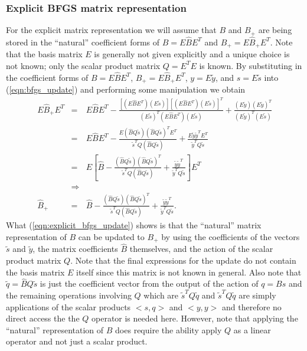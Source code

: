 \documentclass[pdf,ps2pdf,11pt]{SANDreport}
\begin{document}
\subsubsection{Explicit BFGS matrix representation}

For the explicit matrix representation we will assume that $B$ and $B_+$ are
being stored in the ``natural'' coefficient forms of $B = E {}\hat{B} E^T$
and $B_+ = E {}\hat{B}_+ E^T$.  Note that the basis matrix $E$ is generally
not given explicitly and a unique choice is not known; only the scalar product
matrix $Q = E^T E$ is known.  By substituting in the coefficient forms of $B =
E {}\hat{B} E^T$, $B_+ = E {}\hat{B}_+ E^T$, $y = E {}\tilde{y}$, and $s =
E {}\tilde{s}$ into (\ref{eqn:bfgs_update}) and performing some manipulation
we obtain
%
\begin{eqnarray}
E \hat{B}_+ E^T
& = & E \hat{B} E^T
  - \frac{[(E \hat{B} E^T)(E \tilde{s})][(E \hat{B} E^T)(E \tilde{s})]^T}{(E \tilde{s})^T(E \hat{B} E^T)(E \tilde{s})}
  + \frac{(E \tilde{y})(E \tilde{y})^T}{(E \tilde{y})^T (E \tilde{s})} \nonumber \\
& = & E \hat{B} E^T
  - \frac{E(\hat{B} Q \tilde{s})(\hat{B} Q \tilde{s})^T E^T}{\tilde{s}^T Q (\hat{B} Q \tilde{s})}
  + \frac{E \tilde{y} \tilde{y}^T E^T}{\tilde{y}^T Q \tilde{s}} \nonumber \\
& = & E \left[
  \hat{B}
  - \frac{(\hat{B} Q \tilde{s})(\hat{B} Q \tilde{s})^T}{\tilde{s}^T Q (\hat{B} Q \tilde{s})}
  + \frac{\tilde{y} \tilde{y}^T}{\tilde{y}^T Q \tilde{s}}
  \right] E^T \nonumber \\
& \Rightarrow & \nonumber \\
\hat{B}_+
& = & \hat{B}
  - \frac{(\hat{B} Q \tilde{s})(\hat{B} Q \tilde{s})^T}{\tilde{s}^T Q (\hat{B} Q \tilde{s})}
  + \frac{\tilde{y} \tilde{y}^T}{\tilde{y}^T Q \tilde{s}}.
\label{eqn:explicit_bfgs_update}
\end{eqnarray}
%
What (\ref{eqn:explicit_bfgs_update}) shows is that the ``natural'' matrix
representation of $B$ can be updated to $B_+$ by using the coefficients of the
vectors $\tilde{s}$ and $\tilde{y}$, the matrix coefficients $\hat{B}$
themselves, and the action of the scalar product matrix $Q$.  Note that the
final expressions for the update do not contain the basis matrix $E$ itself
since this matrix is not known in general.  Also note that $\tilde{q} =
{}\hat{B}Q\tilde{s}$ is just the coefficient vector from the output of the
action of $q = B s$ and the remaining operations involving $Q$ which are
$\tilde{s}^T Q\tilde{q}$ and $\tilde{s}^T Q\tilde{q}$ are simply applications
of the scalar products $<s,q>$ and $<y,y>$ and therefore no direct access the
the $Q$ operator is needed here.  However, note that applying the ``natural''
representation of $B$ does require the ability apply $Q$ as a linear operator
and not just a scalar product.
\end{document}
